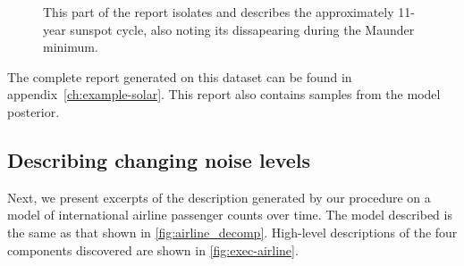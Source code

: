 \begin{figure}[ht!]
\centering
{}
\caption[Automatic description of the solar cycle]
{
This part of the report isolates and describes the approximately 11-year sunspot cycle, also noting its dissapearing during the Maunder minimum.}
\label{fig:periodic}
\end{figure}
%
The complete report generated on this dataset can be found in appendix~\ref{ch:example-solar}.
This report also contains samples from the model posterior.



\subsection{Describing changing noise levels} %
\label{sec:airline}


Next, we present excerpts of the description generated by our procedure on a model of international airline passenger counts over time. %
The model described is the same as that shown in \cref{fig:airline_decomp}.
%
High-level descriptions of the four components discovered are shown in \cref{fig:exec-airline}.

